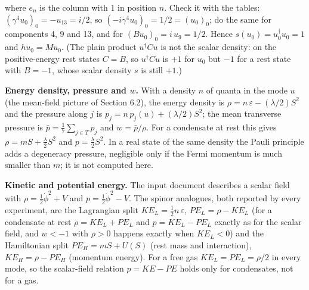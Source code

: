 \documentclass[11pt]{article}
\begin{document}
where $e_n$ is the column with 1 in position $n$. Check it with the tables: $(\gamma^4u_0)_0=-u_{13}=i/2$, so $(-i\gamma^4u_0)_0=1/2=(u_0)_0$; do the same for components 4, 9 and 13, and for $(Bu_0)_0=i\,u_9=1/2$. Hence $s(u_0)=u_0^\dagger u_0=1$ and $hu_0=Mu_0$. (The plain product $u^\dagger Cu$ is not the scalar density: on the positive-energy rest states $C=B$, so $u^\dagger Cu$ is $+1$ for $u_0$ but $-1$ for a rest state with $B=-1$, whose scalar density $s$ is still $+1$.)

\textbf{Energy density, pressure and $w$.} With a density $n$ of quanta in the mode $u$ (the mean-field picture of Section 6.2), the energy density is $\rho=n\,\varepsilon-(\lambda/2)S^2$ and the pressure along $j$ is $p_j=n\,p_j(u)+(\lambda/2)S^2$; the mean transverse pressure is $\bar p=\frac17\sum_{j\in T}p_j$ and $w=\bar p/\rho$. For a condensate at rest this gives $\rho=mS+\frac{\lambda}{2}S^2$ and $p=\frac{\lambda}{2}S^2$. In a real state of the same density the Pauli principle adds a degeneracy pressure, negligible only if the Fermi momentum is much smaller than $m$; it is not computed here.

\textbf{Kinetic and potential energy.} The input document describes a scalar field with $\rho=\frac12\dot\phi^2+V$ and $p=\frac12\dot\phi^2-V$. The spinor analogues, both reported by every experiment, are the Lagrangian split $KE_L=\frac12n\,\varepsilon$, $PE_L=\rho-KE_L$ (for a condensate at rest $\rho=KE_L+PE_L$ and $p=KE_L-PE_L$ exactly as for the scalar field, and $w<-1$ with $\rho>0$ happens exactly when $KE_L<0$) and the Hamiltonian split $PE_H=mS+U(S)$ (rest mass and interaction), $KE_H=\rho-PE_H$ (momentum energy). For a free gas $KE_L=PE_L=\rho/2$ in every mode, so the scalar-field relation $p=KE-PE$ holds only for condensates, not for a gas.
\end{document}
